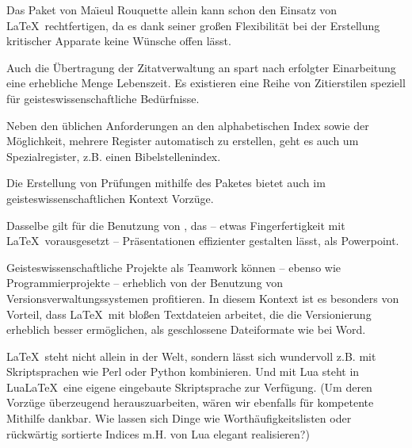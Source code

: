 \documentclass[ngerman]{dtk}
\begin{document}

Das Paket  von Ma\"{\i}eul Rouquette allein kann schon den
Einsatz von \LaTeX\ rechtfertigen, da es dank seiner großen Flexibilität 
bei der Erstellung kritischer Apparate keine Wünsche offen lässt.


Auch die Übertragung der Zitatverwaltung an  spart nach erfolgter Einarbeitung eine erhebliche
Menge Lebenszeit. Es existieren eine Reihe von Zitierstilen speziell für geisteswissenschaftliche Bedürfnisse.


Neben den üblichen Anforderungen an den alphabetischen Index sowie der Möglichkeit, mehrere Register
automatisch zu erstellen, geht es auch um Spezialregister, z.B. einen Bibelstellenindex.


Die Erstellung von Prüfungen mithilfe des Paketes  bietet auch im geisteswissenschaftlichen
Kontext Vorzüge.


Dasselbe gilt für die Benutzung von , das -- etwas Fingerfertigkeit mit \LaTeX\ vorausgesetzt --
Präsentationen effizienter gestalten lässt, als Powerpoint.


Geisteswissenschaftliche Projekte als Teamwork können -- ebenso wie Programmierprojekte -- erheblich von
der Benutzung von Versionsverwaltungssystemen profitieren.
In diesem Kontext ist es besonders von Vorteil, dass \LaTeX\ mit bloßen Textdateien arbeitet, die die
Versionierung erheblich besser ermöglichen, als geschlossene Dateiformate wie bei Word.


\LaTeX\ steht nicht allein in der Welt, sondern lässt sich wundervoll z.B. mit Skriptsprachen wie Perl oder
Python kombinieren. Und mit Lua steht in Lua\LaTeX\ eine eigene eingebaute Skriptsprache zur Verfügung.
(Um deren Vorzüge überzeugend herauszuarbeiten, wären wir ebenfalls für kompetente Mithilfe dankbar.
Wie lassen sich Dinge wie Worthäufigkeitslisten oder rückwärtig sortierte Indices m.H. von Lua elegant
realisieren?)
\end{document}
